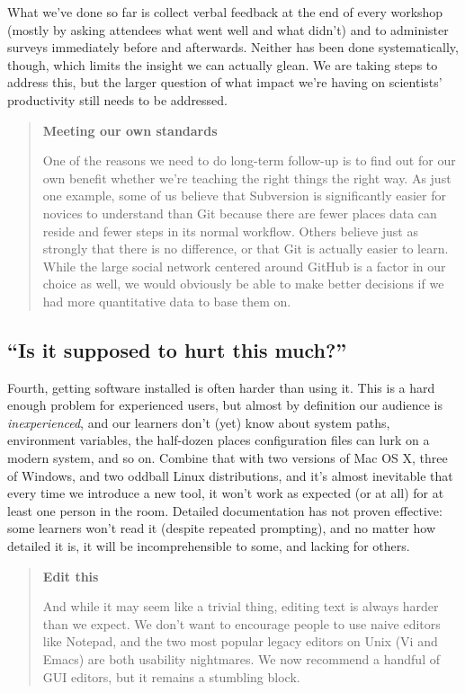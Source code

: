 \documentclass[10pt,a4paper,twocolumn]{article}
\begin{document}
What we've done so far is collect verbal feedback at the end of every
workshop (mostly by asking attendees what went well and what didn't)
and to administer surveys immediately before and afterwards. Neither
has been done systematically, though, which limits the insight we can
actually glean. We are taking steps to address this, but the larger
question of what impact we're having on scientists' productivity still
needs to be addressed.

\begin{quote}
\textbf{Meeting our own standards}

One of the reasons we need to do long-term follow-up is to find out
for our own benefit whether we're teaching the right things the right
way.  As just one example, some of us believe that Subversion is
significantly easier for novices to understand than Git because there
are fewer places data can reside and fewer steps in its normal
workflow. Others believe just as strongly that there is no difference,
or that Git is actually easier to learn. While the large social
network centered around GitHub is a factor in our choice as well, we
would obviously be able to make better decisions if we had more
quantitative data to base them on.
\end{quote}

\subsection*{``Is it supposed to hurt this much?''}

Fourth, getting software installed is often harder than using it. This
is a hard enough problem for experienced users, but almost by
definition our audience is \emph{inexperienced}, and our learners
don't (yet) know about system paths, environment variables, the
half-dozen places configuration files can lurk on a modern system, and
so on. Combine that with two versions of Mac OS X, three of Windows,
and two oddball Linux distributions, and it's almost inevitable that
every time we introduce a new tool, it won't work as expected (or at
all) for at least one person in the room. Detailed documentation has
not proven effective: some learners won't read it (despite repeated
prompting), and no matter how detailed it is, it will be
incomprehensible to some, and lacking for others.

\begin{quote}
\textbf{Edit this}

And while it may seem like a trivial thing, editing text is always
harder than we expect. We don't want to encourage people to use naive
editors like Notepad, and the two most popular legacy editors on Unix
(Vi and Emacs) are both usability nightmares. We now recommend a
handful of GUI editors, but it remains a stumbling block.
\end{quote}
\end{document}
